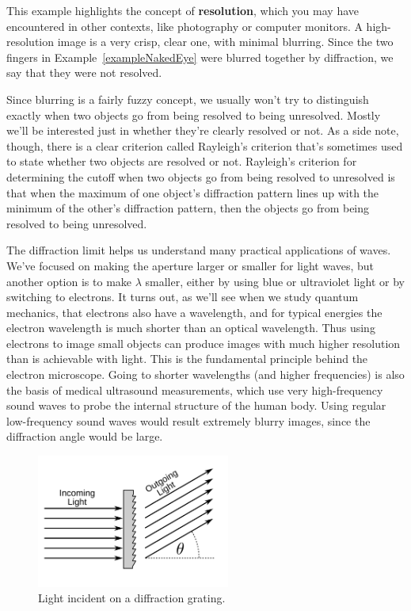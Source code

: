 This example highlights the  concept of \textbf{resolution}, which you
may have  encountered in other contexts, like  photography or computer
monitors. A  high-resolution image  is a very  crisp, clear  one, with
minimal      blurring.      Since      the     two      fingers     in
Example~\ref{exampleNakedEye} were blurred together by diffraction, we
say that they were not resolved. 

Since  blurring is a  fairly fuzzy  concept, we  usually won't  try to
distinguish exactly when  two objects go from being  resolved to being
unresolved. Mostly we'll be interested just in whether they're clearly
resolved or not.   As a side note, though, there  is a clear criterion
called Rayleigh's criterion that's sometimes used to state whether two
objects are resolved or not.  Rayleigh's criterion for determining the
cutoff when two  objects go from being resolved  to unresolved is that
when the maximum of one object's diffraction pattern lines up with the
minimum of the  other's diffraction pattern, then the  objects go from
being resolved to being unresolved.

The diffraction limit helps  us understand many practical applications
of waves.  We've focused on  making the aperture larger or smaller for
light waves, but  another option is to make  $\lambda$ smaller, either
by using  blue or ultraviolet light  or by switching  to electrons. It
turns  out,  as  we'll  see  when we  study  quantum  mechanics,  that
electrons  also  have  a  wavelength,  and for  typical  energies  the
electron wavelength is much  shorter than an optical wavelength.  Thus
using electrons  to image small  objects can produce images  with much
higher resolution than is achievable  with light. This is the fundamental
principle behind
the  electron microscope.   Going to  shorter wavelengths  (and higher
frequencies)  is also  the basis  of medical  ultrasound measurements,
which  use  very high-frequency  sound  waves  to  probe the  internal
structure of  the human body. Using regular  low-frequency sound waves
would  result extremely  blurry  images, since  the diffraction  angle
would be large.





\begin{figure}
\begin{center}
\includegraphics[width=2.5in]{phasors/grating}
\end{center}
\caption{\label{fig:grating}Light incident on a diffraction grating.}
\end{figure}



